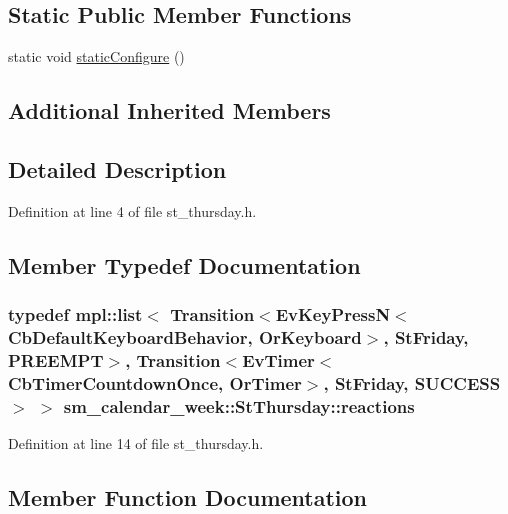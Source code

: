 \subsection*{Static Public Member Functions}
\begin{DoxyCompactItemize}
\item 
static void \hyperlink{structsm__calendar__week_1_1StThursday_ace087bef31c63fa8e67bd835a46b6a6f}{static\+Configure} ()
\end{DoxyCompactItemize}
\subsection*{Additional Inherited Members}


\subsection{Detailed Description}


Definition at line 4 of file st\+\_\+thursday.\+h.



\subsection{Member Typedef Documentation}
\subsubsection[{\texorpdfstring{reactions}{reactions}}]{\setlength{\rightskip}{0pt plus 5cm}typedef mpl\+::list$<$ Transition$<$Ev\+Key\+PressN$<$Cb\+Default\+Keyboard\+Behavior, {\bf Or\+Keyboard}$>$, {\bf St\+Friday}, {\bf P\+R\+E\+E\+M\+PT}$>$, Transition$<$Ev\+Timer$<$Cb\+Timer\+Countdown\+Once, {\bf Or\+Timer}$>$, {\bf St\+Friday}, {\bf S\+U\+C\+C\+E\+SS}$>$ $>$ {\bf sm\+\_\+calendar\+\_\+week\+::\+St\+Thursday\+::reactions}}\hypertarget{structsm__calendar__week_1_1StThursday_a01b39d7646f8e0d4dba1fd189914951f}{}\label{structsm__calendar__week_1_1StThursday_a01b39d7646f8e0d4dba1fd189914951f}


Definition at line 14 of file st\+\_\+thursday.\+h.



\subsection{Member Function Documentation}
